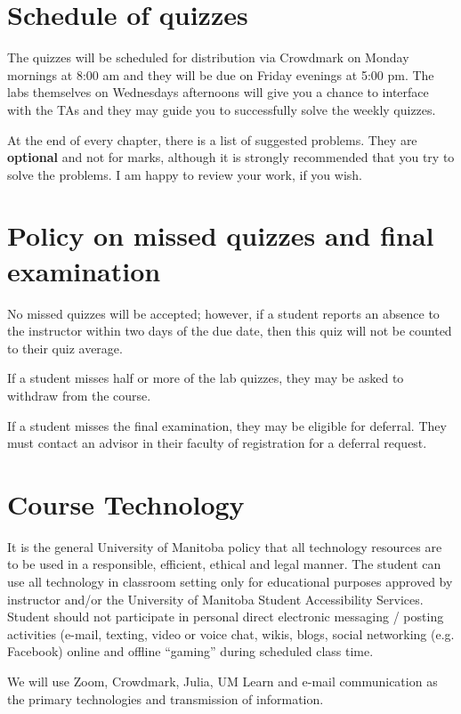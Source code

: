 \documentclass[12pt]{article}
\begin{document}
\section{Schedule of quizzes}

The quizzes will be scheduled for distribution via Crowdmark on Monday mornings at 8:00 am and they will be due on Friday evenings at 5:00 pm. The labs themselves on Wednesdays afternoons will give you a chance to interface with the TAs and they may guide you to successfully solve the weekly quizzes.

At the end of every chapter, there is a list of suggested problems. They are {\bf optional} and not for marks, although it is strongly recommended that you try to solve the problems. I am happy to review your work, if you wish.

\section{Policy on missed quizzes and final examination}

No missed quizzes will be accepted; however, if a student reports an absence to the instructor within two days of the due date, then this quiz will not be counted to their quiz average.

If a student misses half or more of the lab quizzes, they may be asked to withdraw from the course.

If a student misses the final examination, they may be eligible for deferral. They must contact an advisor in their faculty of registration for a deferral request.

\section{Course Technology}

It is the general University of Manitoba policy that all technology resources are to be used in a responsible, efficient, ethical and legal manner. The student can use all technology in classroom setting only for educational purposes approved by instructor and/or the University of Manitoba Student Accessibility Services. Student should not participate in personal direct electronic messaging / posting activities (e-mail, texting, video or voice chat, wikis, blogs, social networking (e.g. Facebook) online and offline ``gaming'' during scheduled class time.

We will use Zoom, Crowdmark, {\sc Julia}, UM Learn and e-mail communication as the primary technologies and transmission of information.
\end{document}
